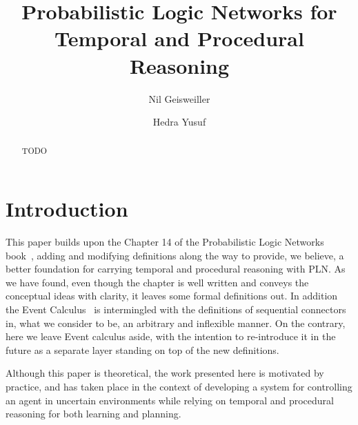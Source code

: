 \documentclass[runningheads]{llncs}
\begin{document}
%
\title{Probabilistic Logic Networks for Temporal and Procedural
  Reasoning}

%
\author{Nil Geisweiller
  \and Hedra Yusuf}
%
%
%
\maketitle              %
%

\begin{abstract}
  TODO

\end{abstract}

\section{Introduction}
\label{sec:intro}
This paper builds upon the Chapter 14 of the Probabilistic Logic
Networks book~\cite{Goertzel09PLN}, adding and modifying definitions
along the way to provide, we believe, a better foundation for carrying
temporal and procedural reasoning with PLN.  As we have found, even
though the chapter is well written and conveys the conceptual ideas
with clarity, it leaves some formal definitions out.  In addition the
Event Calculus~\cite{Shanahan2000} is intermingled with the
definitions of sequential connectors in, what we consider to be, an
arbitrary and inflexible manner.  On the contrary, here we leave Event
calculus aside, with the intention to re-introduce it in the future as
a separate layer standing on top of the new definitions.

Although this paper is theoretical, the work presented here is
motivated by practice, and has taken place in the context of
developing a system for controlling an agent in uncertain environments
while relying on temporal and procedural reasoning for both learning
and planning.

\end{document}
